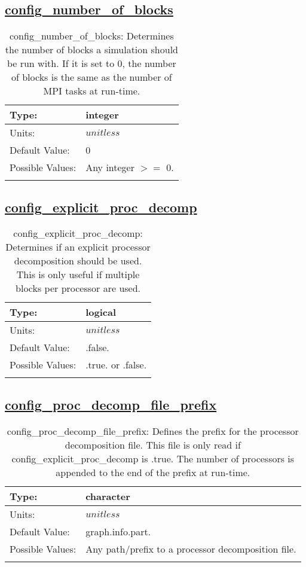 \subsection[config\_number\_of\_blocks]{\hyperref[sec:nm_tab_decomposition]{config\_number\_of\_blocks}}
\label{subsec:nm_sec_config_number_of_blocks}
\begin{center}
\begin{longtable}{| p{2.0in} | p{4.0in} |}
    \hline
    Type: & integer \\
    \hline
    Units: & $unitless$ \\
    \hline
    Default Value: & 0 \\
    \hline
    Possible Values: & Any integer $>=$ 0. \\
    \hline
    \caption{config\_number\_of\_blocks: Determines the number of blocks a simulation should be run with. If it is set to 0, the number of blocks is the same as the number of MPI tasks at run-time.}
\end{longtable}
\end{center}
\subsection[config\_explicit\_proc\_decomp]{\hyperref[sec:nm_tab_decomposition]{config\_explicit\_proc\_decomp}}
\label{subsec:nm_sec_config_explicit_proc_decomp}
\begin{center}
\begin{longtable}{| p{2.0in} | p{4.0in} |}
    \hline
    Type: & logical \\
    \hline
    Units: & $unitless$ \\
    \hline
    Default Value: & .false. \\
    \hline
    Possible Values: & .true. or .false. \\
    \hline
    \caption{config\_explicit\_proc\_decomp: Determines if an explicit processor decomposition should be used. This is only useful if multiple blocks per processor are used.}
\end{longtable}
\end{center}
\subsection[config\_proc\_decomp\_file\_prefix]{\hyperref[sec:nm_tab_decomposition]{config\_proc\_decomp\_file\_prefix}}
\label{subsec:nm_sec_config_proc_decomp_file_prefix}
\begin{center}
\begin{longtable}{| p{2.0in} | p{4.0in} |}
    \hline
    Type: & character \\
    \hline
    Units: & $unitless$ \\
    \hline
    Default Value: & graph.info.part. \\
    \hline
    Possible Values: & Any path/prefix to a processor decomposition file. \\
    \hline
    \caption{config\_proc\_decomp\_file\_prefix: Defines the prefix for the processor decomposition file. This file is only read if config\_explicit\_proc\_decomp is .true. The number of processors is appended to the end of the prefix at run-time.}
\end{longtable}
\end{center}
